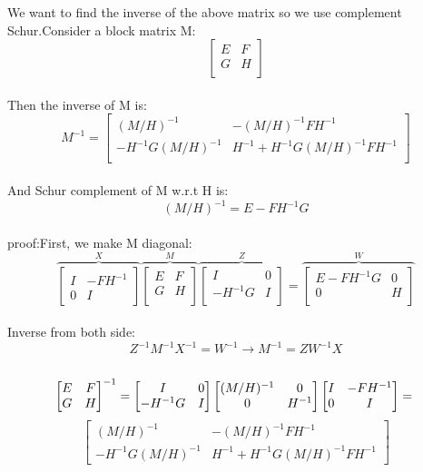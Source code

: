 \documentclass[12pt]{article}
\begin{document}
\begin{qsolve}[Question 1]
	We want to find the inverse of the above matrix so we use complement Schur.Consider a block matrix M:\\
	$$\begin{bmatrix} E & F  \\G& H \\\end{bmatrix}$$\\
	\splitqsolve
	Then the inverse of M is:\\
	$$M^{-1}=\begin{bmatrix} (M/H)^{-1}&-(M/H)^{-1}FH^{-1}  \\-H^{-1}G(M/H)^{-1}&H^{-1}+H^{-1}G(M/H)^{-1}FH^{-1} \\\end{bmatrix}$$\\
	And Schur complement of M w.r.t H is:\\
	$$(M/H)^{-1}=E-FH^{-1}G$$\\
	proof:First, we make M diagonal:\\
	$$\overbrace{\begin{bmatrix} I&-FH^{-1}\\0&I\end{bmatrix}}^X\overbrace{\begin{bmatrix} E&F\\G&H\\\end{bmatrix}}^M\overbrace{\begin{bmatrix} I&0\\-H^{-1}G&I\\\end{bmatrix}}^Z=\overbrace{\begin{bmatrix} E-FH^{-1}G&0\\0&H\\\end{bmatrix}}^W$$\\
	Inverse from both side:\\
	$$Z^{-1}M^{-1}X^{-1}=W^{-1}\rightarrow M^{-1}=ZW^{-1}X$$\\
	$$\begin{bmatrix} E&F\\G&H\\\end{bmatrix}^{-1}=\begin{bmatrix} I&0\\-H^{-1}G&I\\\end{bmatrix}\begin{bmatrix} (M/H)^{-1}&0\\0&H^{-1}\\\end{bmatrix}\begin{bmatrix} I&-FH^{-1}\\0&I\end{bmatrix}=\\$$$$\begin{bmatrix} (M/H)^{-1}&-(M/H)^{-1}FH^{-1}\\-H^{-1}G(M/H)^{-1}&H^{-1}+H^{-1}G(M/H)^{-1}FH^{-1}\end{bmatrix}$$\\

\end{qsolve}
\end{document}
